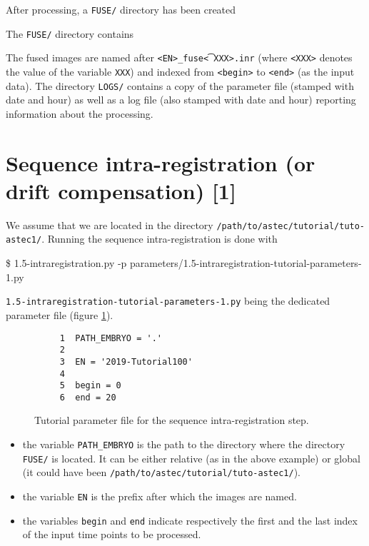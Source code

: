 After processing, a \texttt{FUSE/} directory has been created

\mbox{}
\mbox{}

The \texttt{FUSE/} directory contains 
\mbox{}
\mbox{}

The fused images are named after \texttt{<EN>\_fuse\t<XXX>.inr} (where \texttt{<XXX>}
denotes the value of the variable \texttt{XXX}) and indexed from
\texttt{<begin>} to \texttt{<end>} (as the input data). The directory \texttt{LOGS/} contains
a copy of the parameter file (stamped with date and hour) as well as a
log file (also stamped with date and hour) reporting information about
the processing.





\section{Sequence intra-registration (or drift compensation) [1]}
\label{sec:tutorial:intra:registration:1}

We assume that we are located in the directory
\texttt{/path/to/astec/tutorial/tuto-astec1/}. Running the sequence intra-registration is
done with
\begin{code}{0.8}
  \$ 1.5-intraregistration.py -p parameters/1.5-intraregistration-tutorial-parameters-1.py 
\end{code}
\texttt{1.5-intraregistration-tutorial-parameters-1.py} being the
dedicated parameter file  (figure \ref{fig:tutorial:parameter:intra:registration:1}).

\begin{figure}
\begin{framed}
\begin{verbatim}
     1	PATH_EMBRYO = '.'
     2	
     3	EN = '2019-Tutorial100'
     4	
     5	begin = 0
     6	end = 20
\end{verbatim}
\end{framed}
\caption{\label{fig:tutorial:parameter:intra:registration:1} Tutorial
  parameter file for the sequence intra-registration step.}
\end{figure}

\begin{itemize}
  \itemsep -1ex
  \item the variable \texttt{PATH\_EMBRYO} is the path to the directory where
    the directory \texttt{FUSE/} is located. It can be either relative (as in the
    above example) or
    global (it could have been \texttt{/path/to/astec/tutorial/tuto-astec1/}).
  \item the variable \texttt{EN} is the prefix after which the  images
    are named. 
  \item the variables \texttt{begin} and \texttt{end} indicate respectively the
    first and the last index of the input time points to be processed.
\end{itemize}

